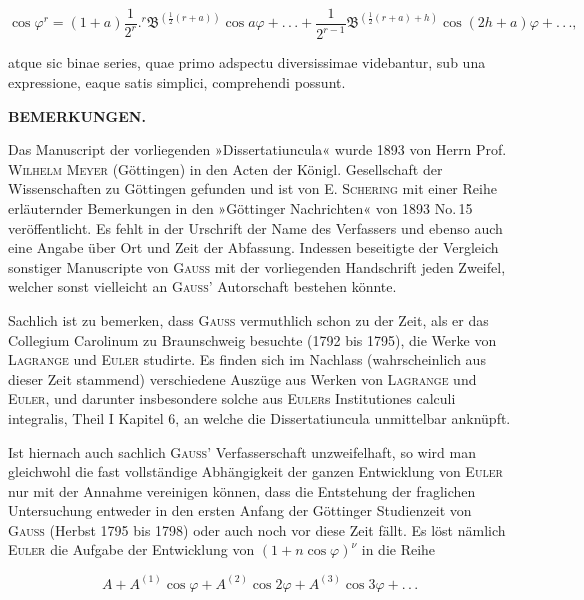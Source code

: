 \[
\cos\varphi^r=(1+a)\frac{1}{2^r}.{}^{r}\mathfrak{B}^{(\frac12(r+a))}\cos a\varphi+.\,.\,.+\frac{1}{2^{r-1}}\mathfrak{B}^{(\frac12(r+a)+h)}\cos(2h+a)\varphi+.\,.\,.,
\]

\noindent atque sic binae series, quae primo adspectu diversissimae videbantur, sub una expressione, eaque satis simplici, comprehendi possunt.

\par\smallskip\hrulefill\smallskip\par

\begin{center}\textbf{BEMERKUNGEN.}\end{center}

Das Manuscript der vorliegenden »Dissertatiuncula« wurde 1893 von Herrn Prof. \textsc{Wilhelm Meyer} (Göttingen) in den Acten der Königl. Gesellschaft der Wissenschaften zu Göttingen gefunden und ist von E. \textsc{Schering} mit einer Reihe erläuternder Bemerkungen in den »Göttinger Nachrichten« von 1893 No.\,15 veröffentlicht. Es fehlt in der Urschrift der Name des Verfassers und ebenso auch eine Angabe über Ort und Zeit der Abfassung. Indessen beseitigte der Vergleich sonstiger Manuscripte von \textsc{Gauss} mit der vorliegenden Handschrift jeden Zweifel, welcher sonst vielleicht an \textsc{Gauss}' Autorschaft bestehen könnte.

Sachlich ist zu bemerken, dass \textsc{Gauss} vermuthlich schon zu der Zeit, als er das Collegium Carolinum zu Braunschweig besuchte (1792 bis 1795), die Werke von \textsc{Lagrange} und \textsc{Euler} studirte. Es finden sich im Nachlass (wahrscheinlich aus dieser Zeit stammend) verschiedene Auszüge aus Werken von \textsc{Lagrange} und \textsc{Euler}, und darunter insbesondere solche aus \textsc{Euler}s Institutiones calculi integralis, Theil I Kapitel 6, an welche die Dissertatiuncula unmittelbar anknüpft.

Ist hiernach auch sachlich \textsc{Gauss}' Verfasserschaft unzweifelhaft, so wird man gleichwohl die fast vollständige Abhängigkeit der ganzen Entwicklung von \textsc{Euler} nur mit der Annahme vereinigen können, dass die Entstehung der fraglichen Untersuchung entweder in den ersten Anfang der Göttinger Studienzeit von \textsc{Gauss} (Herbst 1795 bis 1798) oder auch noch vor diese Zeit fällt. Es löst nämlich \textsc{Euler} die Aufgabe der Entwicklung von $(1+n\cos\varphi)^\nu$ in die Reihe

\[
A + A^{(1)}\cos\varphi + A^{(2)}\cos 2\varphi + A^{(3)}\cos 3\varphi + .\,.\,.
\]

